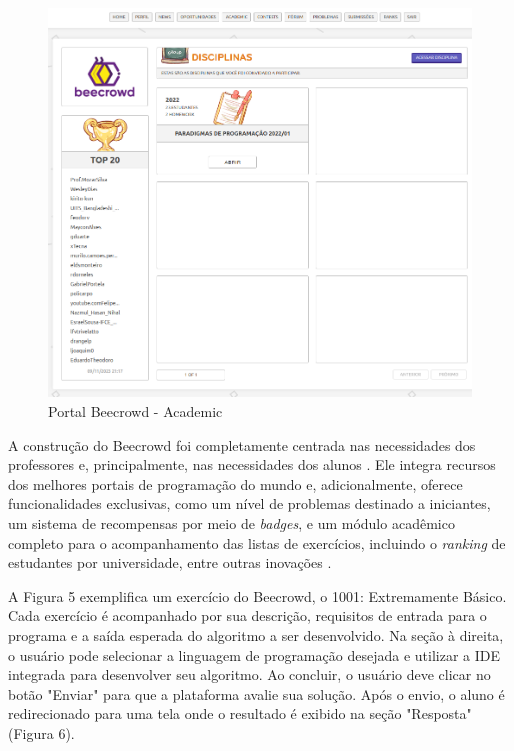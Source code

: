 \begin{figure}[h!]
	   \centering
            \caption{Portal Beecrowd - Academic}
            \label{fig:ModeloConceitual}
	   	\includegraphics[scale=0.3]{pictures/beecrowd_academic.png}
\end{figure}

A construção do Beecrowd foi completamente centrada nas necessidades dos professores e, principalmente, nas necessidades dos alunos \cite[p.~239]{beztonin2014}. Ele integra recursos dos melhores portais de programação do mundo e, adicionalmente, oferece funcionalidades exclusivas, como um nível de problemas destinado a iniciantes, um sistema de recompensas por meio de \textit{badges}, e um módulo acadêmico completo para o acompanhamento das listas de exercícios, incluindo o \textit{ranking} de estudantes por universidade, entre outras inovações \cite[p.~239]{beztonin2014}.

A Figura 5 exemplifica um exercício do Beecrowd, o 1001: Extremamente Básico. Cada exercício é acompanhado por sua descrição, requisitos de entrada para o programa e a saída esperada do algoritmo a ser desenvolvido. Na seção à direita, o usuário pode selecionar a linguagem de programação desejada e utilizar a IDE integrada para desenvolver seu algoritmo. Ao concluir, o usuário deve clicar no botão "Enviar" para que a plataforma avalie sua solução. Após o envio, o aluno é redirecionado para uma tela onde o resultado é exibido na seção "Resposta" (Figura 6).

